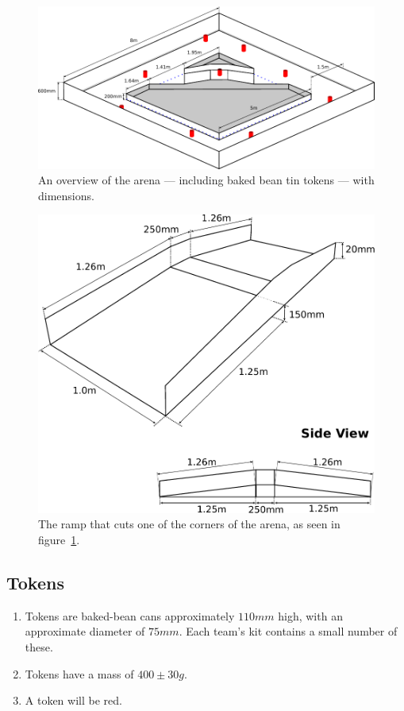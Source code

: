 \begin{figure}
  \includegraphics[keepaspectratio, clip, width=\textwidth]{./images/sr2011-arena.pdf}
  \caption{\label{fig:arena-dim}An overview of the arena --- including baked bean tin tokens --- with dimensions.}
\end{figure}

\begin{figure}
  \begin{center}
    \includegraphics[keepaspectratio,width=\textwidth]{./images/ramp-2011.pdf}
  \end{center}
  \caption{\label{fig:ramp-on-its-own}The ramp that cuts one of the corners of the arena, as seen in figure~\ref{fig:arena-dim}.}
\end{figure}

\subsection{Tokens}
\label{tokens}
\begin {enumerate}
\item Tokens are baked-bean cans approximately $110mm$ high, with an approximate diameter of $75mm$.
 Each team's kit contains a small number of these.
\item Tokens have a mass of $400\pm{}30g$.
\item A token will be red.
\end {enumerate}

